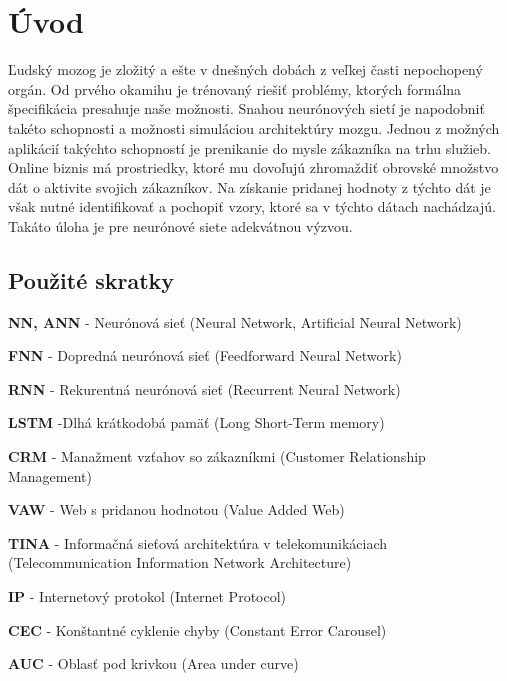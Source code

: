\newpage
\chapter{Úvod}

Ľudský mozog je zložitý a ešte v dnešných dobách z veľkej časti nepochopený orgán. Od prvého okamihu je trénovaný riešiť problémy, ktorých formálna špecifikácia presahuje naše možnosti. Snahou neurónových sietí je napodobniť takéto schopnosti a možnosti simuláciou architektúry mozgu. \newline
Jednou z možných aplikácií takýchto schopností je prenikanie do mysle zákazníka na trhu služieb. Online biznis má prostriedky, ktoré mu dovoľujú zhromaždiť obrovské množstvo dát o aktivite svojich zákazníkov. Na získanie pridanej hodnoty z týchto dát je však nutné identifikovať a pochopiť vzory, ktoré sa v týchto dátach nachádzajú. Takáto úloha je pre neurónové siete adekvátnou výzvou. 
\newpage

\section{Použité skratky}
\label{uvod_pouzite_skratky}

\begin{my_itemize}
\item \textbf{NN, ANN} - Neurónová sieť (Neural Network, Artificial Neural Network)
\item \textbf{FNN} - Dopredná neurónová sieť (Feedforward Neural Network)
\item \textbf{RNN} - Rekurentná neurónová sieť (Recurrent Neural Network)
\item \textbf{LSTM} -Dlhá krátkodobá pamäť (Long Short-Term memory)
\item \textbf{CRM} - Manažment vzťahov so zákazníkmi (Customer Relationship Management)
\item \textbf{VAW} - Web s pridanou hodnotou (Value Added Web)
\item \textbf{TINA} - Informačná sieťová architektúra v telekomunikáciach (Telecommunication Information Network Architecture)
\item \textbf{IP} - Internetový protokol (Internet Protocol)
\item \textbf{CEC} - Konštantné cyklenie chyby (Constant Error Carousel)
\item \textbf{AUC} - Oblasť pod krivkou (Area under curve)
\end{my_itemize}
